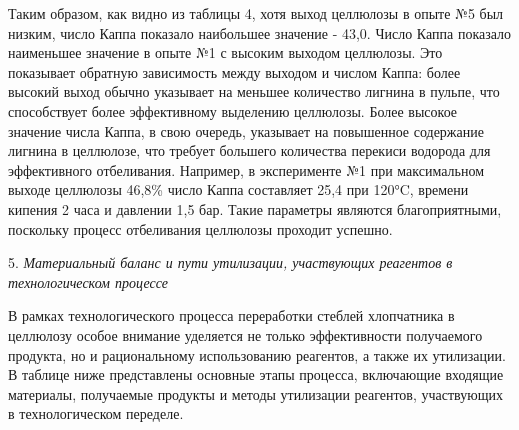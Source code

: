 \begin{multicols}{2}
Таким образом, как видно из таблицы 4, хотя выход целлюлозы в опыте №5
был низким, число Каппа показало наибольшее значение - 43,0. Число Каппа
показало наименьшее значение в опыте №1 с высоким выходом целлюлозы. Это
показывает обратную зависимость между выходом и числом Каппа: более
высокий выход обычно указывает на меньшее количество лигнина в пульпе,
что способствует более эффективному выделению целлюлозы. Более высокое
значение числа Каппа, в свою очередь, указывает на повышенное содержание
лигнина в целлюлозе, что требует большего количества перекиси водорода
для эффективного отбеливания. Например, в эксперименте №1 при
максимальном выходе целлюлозы 46,8\% число Каппа составляет 25,4 при
120°C, времени кипения 2 часа и давлении 1,5 бар. Такие параметры
являются благоприятными, поскольку процесс отбеливания целлюлозы
проходит успешно.

5. \emph{Материальный баланс и пути утилизации, участвующих реагентов в технологическом процессе}

В рамках технологического процесса переработки стеблей хлопчатника в
целлюлозу особое внимание уделяется не только эффективности получаемого
продукта, но и рациональному использованию реагентов, а также их
утилизации. В таблице ниже представлены основные этапы процесса,
включающие входящие материалы, получаемые продукты и методы утилизации
реагентов, участвующих в технологическом переделе.
\end{multicols}


